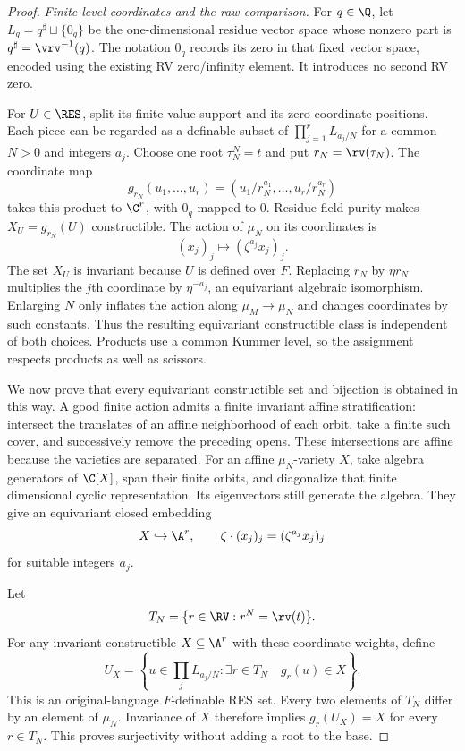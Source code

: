 \begin{proof}
\emph{Finite-level coordinates and the raw comparison.}
For $q\in\Q$, let $L_q=q^\sharp\sqcup\{0_q\}$ be the
one-dimensional residue vector space whose nonzero part is
$q^\sharp=\vrv^{-1}(q)$. The notation $0_q$ records its zero
in that fixed vector space, encoded using the existing RV
zero/infinity element. It introduces no second RV zero.

For $U\in\RES$, split its finite value support and its zero
coordinate positions. Each piece can be regarded as a definable
subset of $\prod_{j=1}^r L_{a_j/N}$ for a common $N>0$ and
integers $a_j$. Choose one root $\tau_N^N=t$ and put
$r_N=\rv(\tau_N)$. The coordinate map
\[
 g_{r_N}(u_1,\ldots,u_r)
   =(u_1/r_N^{a_1},\ldots,u_r/r_N^{a_r})
\]
takes this product to $\C^r$, with $0_q$ mapped to $0$.
Residue-field purity makes $X_U=g_{r_N}(U)$ constructible.
The action of $\mu_N$ on its coordinates is
\[
 (x_j)_j\longmapsto(\zeta^{a_j}x_j)_j .
\]
The set $X_U$ is invariant because $U$ is defined over $F$.
Replacing $r_N$ by $\eta r_N$ multiplies the $j$th coordinate
by $\eta^{-a_j}$, an equivariant algebraic isomorphism.
Enlarging $N$ only inflates the action along
$\mu_M\to\mu_N$ and changes coordinates by such constants.
Thus the resulting equivariant constructible class is independent
of both choices. Products use a common Kummer level, so the
assignment respects products as well as scissors.

We now prove that every equivariant constructible set and
bijection is obtained in this way. A good finite action admits a
finite invariant affine stratification: intersect the translates
of an affine neighborhood of each orbit, take a finite such
cover, and successively remove the preceding opens. These
intersections are affine because the varieties are separated.
For an affine $\mu_N$-variety $X$, take algebra generators of
$\C[X]$, span their finite orbits, and diagonalize that finite
dimensional cyclic representation. Its eigenvectors still
generate the algebra. They give an equivariant closed embedding
\[
 X\hookrightarrow\A^r,\qquad
 \zeta\cdot(x_j)_j=(\zeta^{a_j}x_j)_j
\]
for suitable integers $a_j$.

Let
\[
 T_N=\{r\in\RV:r^N=\rv(t)\}.
\]
For any invariant constructible
$X\subseteq\A^r$ with these coordinate weights, define
\[
 U_X=\left\{u\in\prod_jL_{a_j/N}:
       \exists r\in T_N\quad g_r(u)\in X\right\}.
\]
This is an original-language $F$-definable RES set.
Every two elements of $T_N$ differ by an element of $\mu_N$.
Invariance of $X$ therefore implies
$g_r(U_X)=X$ for every $r\in T_N$.
This proves surjectivity without adding a root to the base.


\end{proof}
